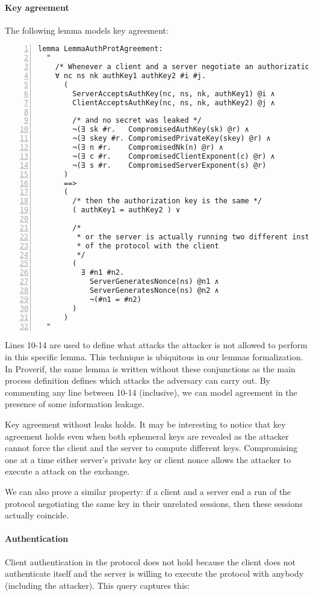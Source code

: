 \paragraph{Key agreement}
The following lemma models key agreement:
\begin{lstlisting}[numbers=left]
lemma LemmaAuthProtAgreement:
  "
    /* Whenever a client and a server negotiate an authorization key */
    ∀ nc ns nk authKey1 authKey2 #i #j.
      (
        ServerAcceptsAuthKey(nc, ns, nk, authKey1) @i ∧
        ClientAcceptsAuthKey(nc, ns, nk, authKey2) @j ∧

        /* and no secret was leaked */
        ¬(∃ sk #r.   CompromisedAuthKey(sk) @r) ∧
        ¬(∃ skey #r. CompromisedPrivateKey(skey) @r) ∧
        ¬(∃ n #r.    CompromisedNk(n) @r) ∧
        ¬(∃ c #r.    CompromisedClientExponent(c) @r) ∧
        ¬(∃ s #r.    CompromisedServerExponent(s) @r)
      )
      ==>
      (
        /* then the authorization key is the same */
        ( authKey1 = authKey2 ) ∨
        
        /* 
         * or the server is actually running two different instances
         * of the protocol with the client
         */
        (
          ∃ #n1 #n2.
            ServerGeneratesNonce(ns) @n1 ∧
            ServerGeneratesNonce(ns) @n2 ∧
            ¬(#n1 = #n2)
        )
      )
  "
\end{lstlisting}

Lines 10-14 are used to define what attacks the attacker is not allowed to perform in this specific lemma. This technique is ubiquitous in our lemmas formalization. In Proverif, the same lemma is written without these conjunctions as the main process definition defines which attacks the adversary can carry out. By commenting any line between 10-14 (inclusive), we can model agreement in the presence of some information leakage.

Key agreement without leaks holds. It may be interesting to notice that key agreement holds even when both ephemeral keys are revealed as the attacker cannot force the client and the server to compute different keys. Compromising one at a time either server's private key or client nonce allows the attacker to execute a \mitm{} attack on the \DiHe{} exchange.

We can also prove a similar property: if a client and a server end a run of the protocol negotiating the same key in their unrelated sessions, then these sessions actually coincide.

\paragraph{Authentication}
Client authentication in the protocol does not hold because the client does not authenticate itself and the server is willing to execute the protocol with anybody (including the attacker). This query captures this:


